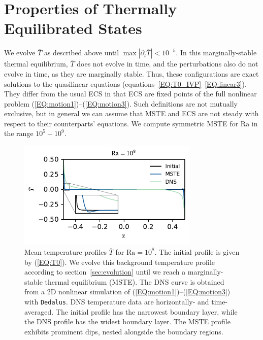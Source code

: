 \documentclass[reprint,amsmath,amssymb,aps,nofootinbib]{revtex4-1}
\newcommand\Ra{\mathrm{Ra}}
\newcommand{\eq}[1]{(\ref{#1})}
\newcommand{\eqss}[2]{(\ref{#1})--(\ref{#2})}
\begin{document}
\section{Properties of Thermally Equilibrated States}\label{sec:properties}
We evolve $\overline{T}$ as described above until $\max|\partial_{t}\overline{T}| < 10^{-5}$.
In this marginally-stable thermal equilibrium, $\overline{T}$ does not evolve in time, and the perturbations also do not evolve in time, as they are marginally stable.
Thus, these configurations are exact solutions to the quasilinear equations (equations~\ref{EQ:T0_IVP}--\ref{EQ:linear3}).
They differ from the usual ECS in that ECS are fixed points of the full nonlinear problem \eqss{EQ:motion1}{EQ:motion3}. 
Such definitions are not mutually exclusive, but in general we can assume that MSTE and ECS are not steady with respect to their counterparts' equations.
We compute symmetric MSTE for $\Ra$ in the range $10^5 - 10^9$.

\begin{figure}
    \centering
    \includegraphics[width=3.4in]{T_profs_na.pdf}
    \caption{Mean temperature profiles $\overline{T}$ for $\Ra = 10^8$. 
    The initial profile is given by \eq{EQ:T0}. 
    We evolve this background temperature profile according to section~\ref{sec:evolution} until we reach a marginally-stable thermal equilibrium (MSTE).
    The DNS curve is obtained from a 2D nonlinear simulation of \eqss{EQ:motion1}{EQ:motion3} with \texttt{Dedalus}.
    DNS temperature data are horizontally- and time-averaged.
    The initial profile has the narrowest boundary layer, while the DNS profile has the widest boundary layer.
    The MSTE profile exhibits prominent dips, nested alongside the boundary regions. }
    \label{fig:T0_profiles}
\end{figure}
\end{document}
